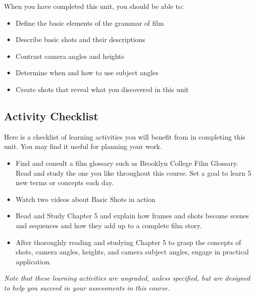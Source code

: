 \documentclass[
]{book}
\providecommand{\tightlist}{%
  \setlength{\itemsep}{0pt}\setlength{\parskip}{0pt}}
\begin{document}
When you have completed this unit, you should be able to:

\begin{itemize}
\tightlist
\item
  Define the basic elements of the grammar of film\\
\item
  Describe basic shots and their descriptions\\
\item
  Contrast camera angles and heights\\
\item
  Determine when and how to use subject angles\\
\item
  Create shots that reveal what you discovered in this unit
\end{itemize}

\hypertarget{activity-checklist-4}{%
\subsection*{Activity Checklist}\label{activity-checklist-4}}

\begin{reflect}
Here is a checklist of learning activities you will benefit from in completing this unit. You may find it useful for planning your work.

\begin{itemize}
\tightlist
\item
  Find and consult a film glossary such as Brooklyn College Film Glossary. Read and study the one you like throughout this course. Set a goal to learn 5 new terms or concepts each day.
\item
  Watch two videos about Basic Shots in action
\item
  Read and Study Chapter 5 and explain how frames and shots become scenes and sequences and how they add up to a complete film story.
\item
  After thoroughly reading and studying Chapter 5 to grasp the concepts of shots, camera angles, heights, and camera subject angles, engage in practical application.
\end{itemize}

\emph{Note that these learning activities are ungraded, unless specified, but are designed to help you succeed in your assessments in this course.}
\end{reflect}
\end{document}

